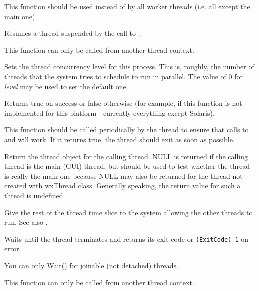 This function should be used instead of  by all worker
threads (i.e. all except the main one).

\label{wxthreadresume}


Resumes a thread suspended by the call to .

This function can only be called from another thread context.

\label{wxthreadsetconcurrency}


Sets the thread concurrency level for this process. This is, roughly, the
number of threads that the system tries to schedule to run in parallel.
The value of $0$ for {\it level} may be used to set the default one.

Returns true on success or false otherwise (for example, if this function is
not implemented for this platform - currently everything except Solaris).

\label{wxthreadtestdestroy}


This function should be called periodically by the thread to ensure that calls
to  and  will
work. If it returns true, the thread should exit as soon as possible.

\label{wxthreadthis}


Return the thread object for the calling thread. NULL is returned if the calling thread
is the main (GUI) thread, but  should be used to test
whether the thread is really the main one because NULL may also be returned for the thread
not created with wxThread class. Generally speaking, the return value for such a thread
is undefined.

\label{wxthreadyield}


Give the rest of the thread time slice to the system allowing the other threads to run.
See also .

\label{wxthreadwait}


Waits until the thread terminates and returns its exit code or {\tt (ExitCode)-1} on error.

You can only Wait() for joinable (not detached) threads.

This function can only be called from another thread context.


